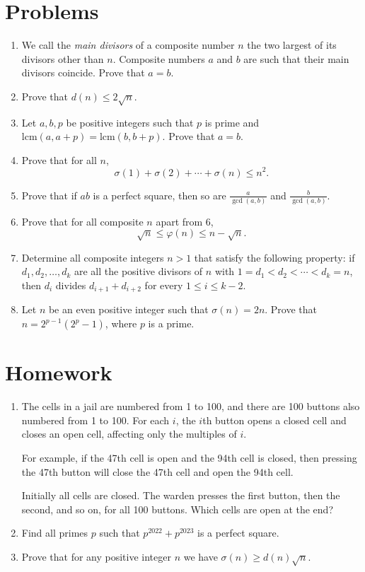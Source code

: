 \documentclass{article}
\newcommand\lcm{\text{lcm}}
\begin{document}
\section{Problems}
\begin{enumerate}
  \item We call the \emph{main divisors} of a composite number $n$ the two
    largest of its divisors other than $n$. Composite numbers $a$ and $b$ are
    such that their main divisors coincide. Prove that $a=b$.
  \item Prove that $d(n)\le 2\sqrt n$.
  \item Let $a,b,p$ be positive integers such that $p$ is prime and
    $\lcm(a,a+p)=\lcm(b,b+p)$. Prove that $a=b$.
  \item Prove that for all $n$,
    \[\sigma(1)+\sigma(2)+\cdots+\sigma(n)\le n^2.\]
  \item Prove that if $ab$ is a perfect square, then so are $\frac a{\gcd(a,b)}$ and
      $\frac b{\gcd(a,b)}$.
  \item Prove that for all composite $n$ apart from 6,
    \[\sqrt n\le\varphi(n)\le n-\sqrt n.\]
  \item Determine all composite integers $n>1$ that satisfy the following
    property: if $d_1, d_2, \ldots, d_k$ are all the positive divisors of $n$
    with $1=d_1<d_2<\cdots<d_k=n$, then $d_i$ divides $d_{i+1}+d_{i+2}$ for
    every $1 \leq i \leq k-2$.
  \item Let $n$ be an even positive integer such that $\sigma(n)=2n$. Prove that
    $n=2^{p-1}\left(2^p-1\right)$, where $p$ is a prime.
\end{enumerate}
\newpage
\section{Homework}
\begin{enumerate}
  \item The cells in a jail are numbered from 1 to 100, and there are 100
    buttons also numbered from 1 to 100. For each $i$, the $i$th button opens a
    closed cell and closes an open cell, affecting only the multiples of $i$. 

    For example, if the 47th cell is open and the 94th cell is closed, then
    pressing the 47th button will close the 47th cell and open the 94th cell.

    Initially all cells are closed.
    The warden presses the first button, then the second, and so on, for all
    100 buttons. Which cells are open at the end?
  \item Find all primes $p$ such that $p^{2022}+p^{2023}$ is a perfect square.
  \item Prove that for any positive integer $n$ we have $\sigma(n)\ge d(n)\sqrt
    n$.
\end{enumerate}
\end{document}
